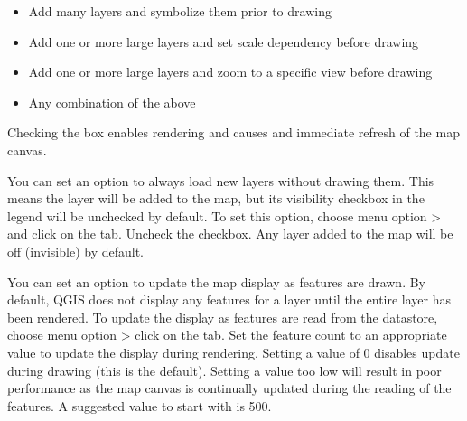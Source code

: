 \begin{itemize}
\item Add many layers and symbolize them prior to drawing
\item Add one or more large layers and set scale dependency before drawing
\item Add one or more large layers and zoom to a specific view before
drawing
\item Any combination of the above
\end{itemize}

Checking the  box enables rendering and causes and immediate
refresh of the map canvas.

\label{label_settinglayer}

You can set an option to always load new layers without drawing them. This
means the layer will be added to the map, but its visibility checkbox in the
legend will be unchecked by default. To set this option, choose
menu option  >  and click on the
 tab. Uncheck the  checkbox. Any layer added to the map will be off (invisible) by
default.

%
%

\label{label_updatemap}

You can set an option to update the map display as features are drawn. By
default, QGIS does not display any features for a layer until the entire
layer has been rendered. To update the display as features are read from the
datastore, choose menu option  > 
click on the  tab. Set the feature count to an
appropriate value to update the display during rendering. Setting a value of 0
disables update during drawing (this is the default). Setting a value too low
will result in poor performance as the map canvas is continually updated
during the reading of the features. A suggested value to start with is 500. 

